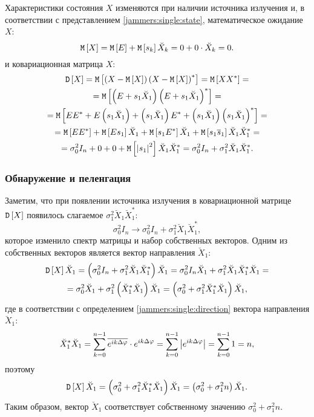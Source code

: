 Характеристики состояния $X$ изменяются при наличии источника излучения и, в соответствии с представлением \eqref{jammers:single:state}, математическое ожидание
$X$:
\[
    \mathtt{M} \left [ X \right ]
    = \mathtt{M} \left [ E \right ] + \mathtt{M} \left [ s_k \right ] \breve{X}_k
    = 0 + 0 \cdot \breve{X}_k
    = 0.
\]
и ковариационная матрица $X$:
\begin{multline*}
    \mathtt{D} \left [ X \right ]
    = \mathtt{M} \left [ \left ( X - \mathtt{M} \left [ X \right ] \right ) \left ( X - \mathtt{M} \left [ X \right ] \right )^* \right ]
    = \mathtt{M} \left [ X X^* \right ] = \\
    = \mathtt{M} \left [ \left ( E + s_1 \breve{X}_1 \right ) \left ( E + s_1 \breve{X}_1 \right )^* \right ] = \\
    = \mathtt{M} \left [ E E^* + E \left ( s_1 \breve{X}_1 \right ) + \left ( s_1 \breve{X}_1 \right ) E^* + \left ( s_1 \breve{X}_1 \right ) \left ( s_1 \breve{X}_1 \right )^* \right ] = \\
    = \mathtt{M} \left [ E E^* \right ] + \mathtt{M} \left [ E s_1 \right ] \breve{X}_1 + \mathtt{M} \left [ s_1 E^* \right ] \breve{X}_1 + \mathtt{M} \left [ s_1 \overline{s}_1 \right ] \breve{X}_1 \breve{X}_1^* = \\
    = \sigma_0^2 I_n + 0 + 0 + \mathtt{M} \left [ \left | s_1 \right |^2 \right ] \breve{X}_1 \breve{X}_1^*
    = \sigma_0^2 I_n + \sigma_1^2 \breve{X}_1 \breve{X}_1^*
    .
\end{multline*}

\subsubsection{Обнаружение и пеленгация}

Заметим, что при появлении источника излучения в ковариационной матрице $\mathtt{D} \left [ X \right ]$ появилось слагаемое $\sigma_1^2 \breve{X}_1 \breve{X}_1^*$:
\[
    \sigma_0^2 I_n \rightarrow \sigma_0^2 I_n + \sigma_1^2 \breve{X}_1 \breve{X}_1^* ,
\]
которое изменило спектр матрицы и набор собственных векторов. Одним из собственных векторов является вектор направления $\breve{X}_1$:
\begin{multline*}
    \mathtt{D} \left [ X \right ] \breve{X}_1
    = \left ( \sigma_0^2 I_n + \sigma_1^2 \breve{X}_1 \breve{X}_1^* \right ) \breve{X}_1
    = \sigma_0^2 I_n \breve{X}_1 + \sigma_1^2 \breve{X}_1 \breve{X}_1^* \breve{X}_1 = \\
    = \sigma_0^2 \breve{X}_1 + \sigma_1^2 \left ( \breve{X}_1^* \breve{X}_1 \right ) \breve{X}_1
    = \left ( \sigma_0^2 + \sigma_1^2 \breve{X}_1^* \breve{X}_1 \right ) \breve{X}_1 ,
\end{multline*}
где в соответствии с определением \eqref{jammers:single:direction} вектора направления $\breve{X}_1$:
\begin{equation}
    \label{jammers:single:direction_self_product}
    \breve{X}_1^* \breve{X}_1
    = \sum_{k=0}^{n-1} \overline{e^{i k \Delta \varphi}} \cdot e^{i k \Delta \varphi}
    = \sum_{k=0}^{n-1} \left | e^{i k \Delta \varphi} \right |
    = \sum_{k=0}^{n-1} 1
    = n ,
\end{equation}
поэтому
\[
    \mathtt{D} \left [ X \right ] \breve{X}_1
    = \left ( \sigma_0^2 + \sigma_1^2 \breve{X}_1^* \breve{X}_1 \right ) \breve{X}_1
    = \left ( \sigma_0^2 + \sigma_1^2 n \right ) \breve{X}_1 .
\]
Таким образом, вектор $\breve{X}_1$ соответствует собственному значению $\sigma_0^2 + \sigma_1^2 n$.

